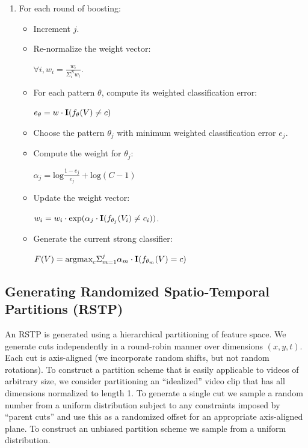 \documentclass{bmvc2k}
\begin{document}
\begin{enumerate}
				\item For each round of boosting:
					\begin{itemize}
						\item Increment $j$.
						\item Re-normalize the weight vector:
              \begin{center}
              $\forall i, w_i = \frac{w_i}{\Sigma_i^N w_i}$.
              \end{center}
					  \item For each pattern $\theta$,
              compute its weighted classification error:
              \begin{center}
              $e_\theta = w \cdot \mbox{\textbf{I}}(f_\theta(V) \neq c)$
              \end{center}
						\item Choose the pattern $\theta_j$ with minimum weighted
              classification error $e_j$.
						\item Compute the weight for $\theta_j$:
              \begin{center}
              $\alpha_j = \mbox{log} \frac{1 - e_j}{e_j} + \mbox{log}(C-1)$
              \end{center}
						\item Update the weight vector:
              \begin{center}
							$w_i = w_i \cdot \mbox{exp}(\alpha_j \cdot
							\mbox{\textbf{I}}(f_{\theta_j}(V_i) \neq c_i))$.
              \end{center}
						\item Generate the current strong classifier:
              \begin{center}
							$F(V) = \mbox{argmax}_c \Sigma_{m=1}^j \alpha_m \cdot
							\mbox{\textbf{I}}(f_{\theta_m}(V) = c)$
              \end{center}
					\end{itemize}

			\end{enumerate}
	

  \subsection{Generating Randomized Spatio-Temporal Partitions (RSTP)}
  An RSTP is generated using a hierarchical partitioning of feature space.  
  We generate cuts independently in a round-robin manner over dimensions $(x, y, t)$. 
  Each cut is axis-aligned
  (we incorporate random shifts, but not random rotations).
  To construct a partition scheme that is easily applicable to videos of
  arbitrary size, we consider
  partitioning an ``idealized'' video clip that has all dimensions normalized
  to length 1. To generate a single cut we sample a random number from a
  uniform distribution subject to any constraints imposed by ``parent cuts'' and use
  this as a randomized offset for an appropriate axis-aligned plane. To
  construct an unbiased partition scheme we sample from a uniform
  distribution.
  
\end{document}

